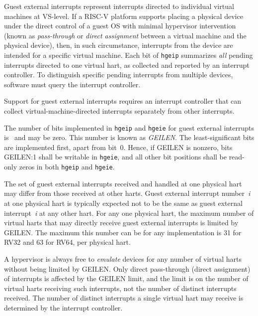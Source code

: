 Guest external interrupts represent interrupts directed to individual
virtual machines at VS-level.
If a RISC-V platform supports placing a physical device under the direct
control of a guest OS with minimal hypervisor intervention (known as
\emph{pass-through} or \emph{direct assignment} between a virtual machine
and the physical device), then, in such circumstance, interrupts from the
device are intended for a specific virtual machine.
Each bit of {\tt hgeip} summarizes \emph{all} pending interrupts directed
to one virtual hart, as collected and reported by an interrupt
controller.
To distinguish specific pending interrupts from multiple devices,
software must query the interrupt controller.

\begin{commentary}
Support for guest external interrupts requires an interrupt controller
that can collect virtual-machine-directed interrupts separately from
other interrupts.
\end{commentary}

The number of bits implemented in {\tt hgeip} and {\tt hgeie} for guest
external interrupts is \unspecified\ and may be zero.
This number is known as \textit{GEILEN}.
The least-significant bits are implemented first, apart from bit~0.
Hence, if GEILEN is nonzero, bits GEILEN:1 shall be writable in
{\tt hgeie}, and all other bit positions shall be read-only zeros in
both {\tt hgeip} and {\tt hgeie}.

\begin{commentary}
The set of guest external interrupts received and handled at one physical
hart may differ from those received at other harts.
Guest external interrupt number~\textit{i} at one physical hart is
typically expected not to be the same as guest external
interrupt~\textit{i} at any other hart.
For any one physical hart, the maximum number of virtual harts that may
directly receive guest external interrupts is limited by GEILEN.
The maximum this number can be for any implementation is 31 for RV32 and
63 for RV64, per physical hart.

A hypervisor is always free to \emph{emulate} devices for any number of
virtual harts without being limited by GEILEN.
Only direct pass-through (direct assignment) of interrupts is affected by
the GEILEN limit, and the limit is on the number of virtual harts
receiving such interrupts, not the number of distinct interrupts
received.
The number of distinct interrupts a single virtual hart may receive is
determined by the interrupt controller.
\end{commentary}

